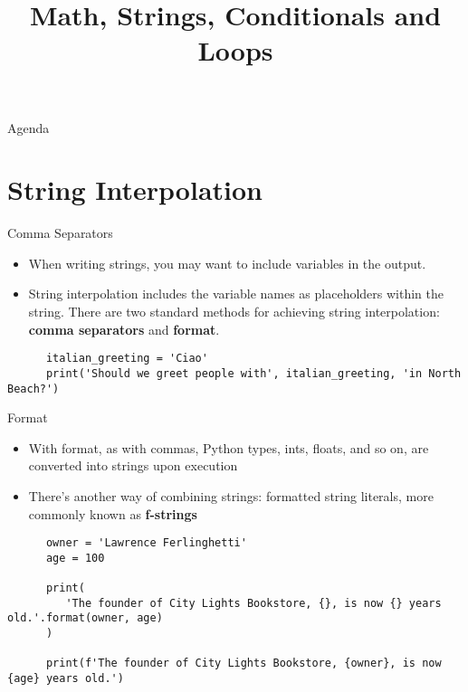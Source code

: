 \documentclass[../main.tex]{subfiles}
\title{Math, Strings, Conditionals and Loops}
\begin{document}
\begin{frame}
  \maketitle
\end{frame}


\begin{frame}{Agenda}
  \tableofcontents
\end{frame}



\section{String Interpolation}
\label{sec:string-interpolation}

\begin{frame}[fragile]{Comma Separators}
  \begin{itemize} \parskip3mm \justifying
  \item   When writing strings, you may want to include variables in the output.
  \item String interpolation includes the variable names as placeholders within the string. There are two standard methods for achieving string interpolation: \textbf{comma separators} and \textbf{format}.
  
  \end{itemize}

  \begin{code}{}
\begin{lstlisting}
      italian_greeting = 'Ciao'
      print('Should we greet people with', italian_greeting, 'in North Beach?')
  \end{lstlisting}
  \end{code}

\end{frame}

\begin{frame}[fragile]{Format}
  \begin{itemize} \parskip3mm \justifying
  \item With format, as with commas, Python types, ints, floats, and so on, are converted into strings upon execution
  \item There’s another way of combining strings: \alert{formatted string literals}, more commonly known as \textbf{f-strings}
  \end{itemize}

  \begin{code}{}
    \begin{lstlisting}
      owner = 'Lawrence Ferlinghetti'
      age = 100
      
      print(
         'The founder of City Lights Bookstore, {}, is now {} years old.'.format(owner, age)
      )
      
      print(f'The founder of City Lights Bookstore, {owner}, is now {age} years old.')
    \end{lstlisting}
  \end{code}
\end{frame}
\end{document}
